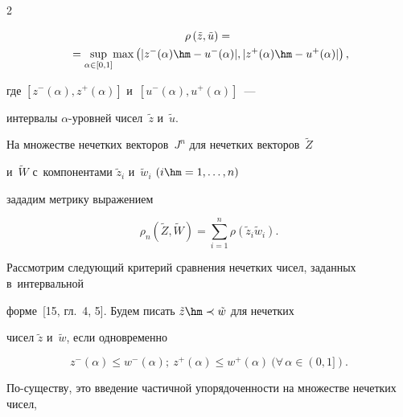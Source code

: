 \begin{multicols}{2}
\noindent


\begin{multline*}


\rho\left(\tilde{z}, \tilde{u}\right) ={}\\


{}= \sup\limits_{\alpha\in[0, 1]}\!\max\left(|z^{-}


(\alpha) \hm- u^{-}(\alpha)|, |z^{+}(\alpha) \hm- u^{+}(\alpha)| \right),


\end{multline*}








\noindent


где $[z^{-}(\alpha), z^{+}(\alpha)]$ и~$[u^{-}(\alpha), u^{+}(\alpha)]$~---


интервалы \mbox{$\alpha$-уров}\-ней чисел~$\tilde{z}$ и~$\tilde{u}$.





На множестве нечетких векторов~$J^n$ для нечетких векторов~$\tilde{Z}$ 


и~$\tilde{W}$ с~компонентами $\tilde{z}_i$ и~$\tilde{w}_i$ $(i\hm=1,\ldots,n)$ 


зададим метрику выражением


$$


\rho_n\left(\tilde{Z}, \tilde{W}\right) = \sum\limits_{i=1}^n\rho\left(\tilde{z}_i \tilde{w}_i\right).


$$








Рассмотрим следующий критерий сравнения нечетких чисел, заданных в~интервальной 


форме~[15, гл.~4, 5]. Будем писать $\tilde{z}\hm\prec\tilde{w}$ для нечетких 


чисел $\tilde{z}$ и~$\tilde{w}$, если одновременно


\begin{equation}


z^{-}(\alpha)\leq w^{-}(\alpha); \ z^{+}(\alpha)\leq 


w^{+}(\alpha)\ (\forall\,\alpha\in (0,1]).


\label{e1-h}


\end{equation}


%


По-существу, это введение частичной упо\-ря\-до\-чен\-ности на множестве нечетких чисел, 



\end{multicols}
